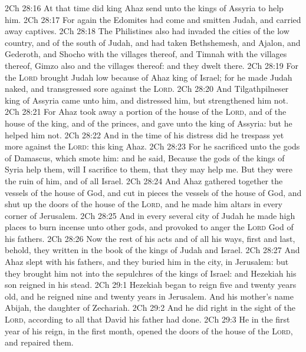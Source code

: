 \vs 2Ch 28:16 At that time did king Ahaz send unto the kings of Assyria to help him.
\vs 2Ch 28:17 For again the Edomites had come and smitten Judah, and carried away captives.
\vs 2Ch 28:18 The Philistines also had invaded the cities of the low country, and of the south of Judah, and had taken Bethshemesh, and Ajalon, and Gederoth, and Shocho with the villages thereof, and Timnah with the villages thereof, Gimzo also and the villages thereof: and they dwelt there.
\vs 2Ch 28:19 For the \textsc{Lord} brought Judah low because of Ahaz king of Israel; for he made Judah naked, and transgressed sore against the \textsc{Lord}.
\vs 2Ch 28:20 And Tilgathpilneser king of Assyria came unto him, and distressed him, but strengthened him not.
\vs 2Ch 28:21 For Ahaz took away a portion  of the house of the \textsc{Lord}, and  of the house of the king, and of the princes, and gave  unto the king of Assyria: but he helped him not.
\vs 2Ch 28:22 And in the time of his distress did he trespass yet more against the \textsc{Lord}: this  king Ahaz.
\vs 2Ch 28:23 For he sacrificed unto the gods of Damascus, which smote him: and he said, Because the gods of the kings of Syria help them,  will I sacrifice to them, that they may help me. But they were the ruin of him, and of all Israel.
\vs 2Ch 28:24 And Ahaz gathered together the vessels of the house of God, and cut in pieces the vessels of the house of God, and shut up the doors of the house of the \textsc{Lord}, and he made him altars in every corner of Jerusalem.
\vs 2Ch 28:25 And in every several city of Judah he made high places to burn incense unto other gods, and provoked to anger the \textsc{Lord} God of his fathers.
\vs 2Ch 28:26 Now the rest of his acts and of all his ways, first and last, behold, they  written in the book of the kings of Judah and Israel.
\vs 2Ch 28:27 And Ahaz slept with his fathers, and they buried him in the city,  in Jerusalem: but they brought him not into the sepulchres of the kings of Israel: and Hezekiah his son reigned in his stead.
\vs 2Ch 29:1 Hezekiah began to reign  five and twenty years old, and he reigned nine and twenty years in Jerusalem. And his mother's name  Abijah, the daughter of Zechariah.
\vs 2Ch 29:2 And he did  right in the sight of the \textsc{Lord}, according to all that David his father had done.
\vs 2Ch 29:3 He in the first year of his reign, in the first month, opened the doors of the house of the \textsc{Lord}, and repaired them.
